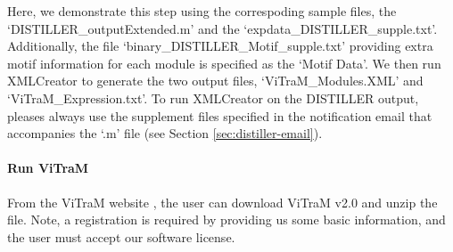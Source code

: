 Here, we demonstrate this step using the correspoding sample files, the
`DISTILLER\_outputExtended.m' and the `expdata\_DISTILLER\_supple.txt'.
%
Additionally, the file `binary\_DISTILLER\_Motif\_supple.txt' providing extra
motif information for each module is specified as the `Motif Data'.
%
We then run XMLCreator to generate the two output files, `ViTraM\_Modules.XML'
and `ViTraM\_Expression.txt'.
%
To run XMLCreator on the DISTILLER output, pleases always use the supplement
files specified in the notification email that accompanies the `.m' file (see
Section \ref{sec:distiller-email}).


\paragraph{Run ViTraM}

From the ViTraM website \cite{ViTraM}, the user can 
download ViTraM v2.0 and unzip the file. Note, a registration is required by 
providing us some basic information, and the user must accept our software 
license.

